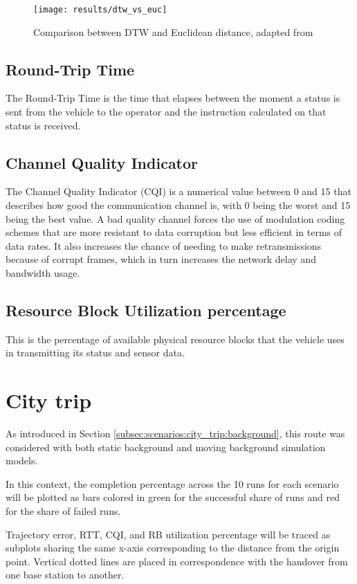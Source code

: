 \begin{figure}[H]
    \centering
    \texttt{[image: results/dtw\_vs\_euc]}
    \caption{Comparison between DTW and Euclidean distance, adapted from \cite{tavenard.blog.dtw}}
    \label{fig:dtw_vs_euc}
\end{figure}

\subsection{Round-Trip Time}
The Round-Trip Time is the time that elapses between the moment a status is sent from the vehicle to the operator and the instruction calculated on that status is received.

\subsection{Channel Quality Indicator}
The Channel Quality Indicator (CQI) is a numerical value between 0 and 15 that describes how good the communication channel is, with 0 being the worst and 15 being the best value. A bad quality channel forces the use of modulation coding schemes that are more resistant to data corruption but less efficient in terms of data rates. It also increases the chance of needing to make retransmissions because of corrupt frames, which in turn increases the network delay and bandwidth usage.

\subsection{Resource Block Utilization percentage}
This is the percentage of available physical resource blocks that the vehicle uses in transmitting its status and sensor data.

\section{City trip}
As introduced in Section \ref{subsec:scenarios:city_trip:background}, this route was considered with both static background and moving background simulation models.

In this context, the completion percentage across the 10 runs for each scenario will be plotted as bars colored in green for the successful share of runs and red for the share of failed runs.

Trajectory error, RTT, CQI, and RB utilization percentage will be traced as subplots sharing the same x-axis corresponding to the distance from the origin point. Vertical dotted lines are placed in correspondence with the handover from one base station to another.

